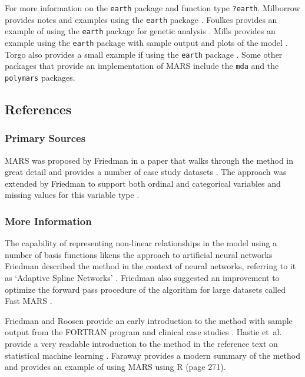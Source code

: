 For more information on the \texttt{earth} package and function type \texttt{?earth}. Milborrow provides notes and examples using the \texttt{earth} package \cite{Milborrow2011}. Foulkes provides an example of using the \texttt{earth} package for genetic analysis \cite{Foulkes2009}. Mills provides an example using the \texttt{earth} package with sample output and plots of the model \cite{Mills2010}. Torgo also provides a small example if using the \texttt{earth} package \cite{Torgo2009}. 
Some other packages that provide an implementation of MARS include the \texttt{mda} and the \texttt{polymars} packages.

\subsection{References}

\subsubsection{Primary Sources}
MARS was proposed by Friedman in a paper that walks through the method in great detail and provides a number of case study datasets \cite{Friedman1991}.
The approach was extended by Friedman to support both ordinal and categorical variables and missing values for this variable type \cite{Friedman1991a, Friedman1993a}.

\subsubsection{More Information}
The capability of representing non-linear relationships in the model using a number of basis functions likens the approach to artificial neural networks Friedman described the method in the context of neural networks, referring to it as `Adaptive Spline Networks' \cite{Friedman1991b, Friedman1991c}.
Friedman also suggested an improvement to optimize the forward pass procedure of the algorithm for large datasets called Fast MARS \cite{Friedman1993}.

Friedman and Roosen provide an early introduction to the method with sample output from the FORTRAN program and clinical case studies \cite{Friedman1995}. Hastie et~al. provide a very readable introduction to the method in the reference text on statistical machine learning \cite{Hastie2009}.
Faraway provides a modern summary of the method and provides an example of using MARS using R \cite{Faraway2006} (page 271).


